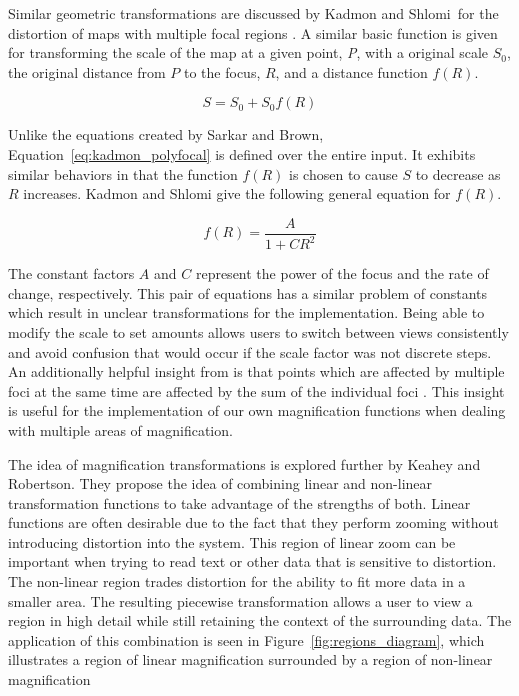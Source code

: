 Similar geometric transformations are discussed  by Kadmon and Shlomi\ for the distortion of maps with multiple focal regions \cite{Kadmon1978}. A similar basic function is given for transforming the scale of the map at a given point, \emph{P}, with a original scale $S_0$, the original distance from $P$ to the focus, $R$, and a distance function $f(R)$.

\begin{equation}
    \label{eq:kadmon_polyfocal} 
    S = S_0 + S_0 f(R)
\end{equation}

Unlike the equations created by Sarkar and Brown, Equation~\ref{eq:kadmon_polyfocal} is defined over the entire input. It exhibits similar behaviors in that the function $f(R)$ is chosen to cause $S$ to decrease as $R$ increases. Kadmon and Shlomi give the following general equation for $f(R)$.

\begin{equation}
    \label{eq:f_kadmon}
    f(R) = \frac{A}{1 + CR^2}
\end{equation}

The constant factors $A$ and $C$ represent the power of the focus and the rate of change, respectively. This pair of equations has a similar problem of constants which result in unclear transformations for the implementation. Being able to modify the scale to set amounts allows users to switch between views consistently and avoid confusion that would occur if the scale factor was not discrete steps. An additionally helpful insight from is that points which are affected by multiple
foci at the same time are affected by the sum of the individual foci \cite{Kadmon1978}. This insight is useful for the implementation of our own magnification functions when dealing with multiple areas of magnification.

The idea of magnification transformations is explored further by Keahey and Robertson. They propose the idea of combining linear and non-linear transformation functions to take advantage of the strengths of both. Linear functions are often desirable due to the fact that they perform zooming without introducing distortion into the system. This region of linear zoom can be important when trying to read text or other data that is sensitive to distortion. The non-linear region trades
distortion for the ability to fit more data in a smaller area. The resulting piecewise transformation allows a user to view a region in high detail while still retaining the context of the surrounding data. The application of this combination is seen in Figure~\ref{fig:regions_diagram}, which illustrates a region of linear magnification surrounded by a region of non-linear magnification

